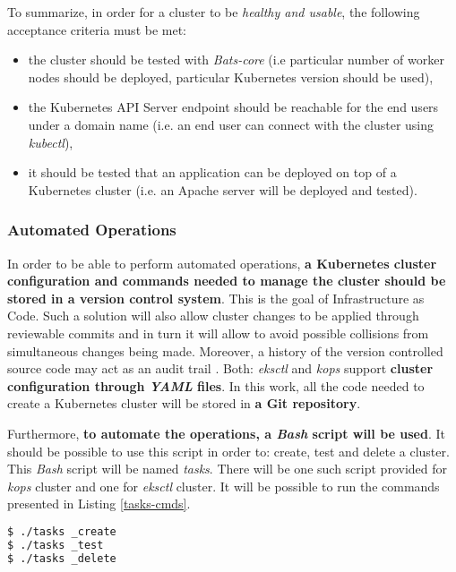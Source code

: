 To summarize, in order for a cluster to be \textit{healthy and usable}, the following acceptance criteria must be met:
\begin{itemize}
\item the cluster should be tested with \textit{Bats-core} (i.e particular number of worker nodes should be deployed, particular Kubernetes version should be used),
\item the Kubernetes API Server endpoint should be reachable for the end users under a domain name (i.e. an end user can connect with the cluster using \textit{kubectl}),
\item it should be tested that an application can be deployed on top of a Kubernetes cluster (i.e. an Apache server will be deployed and tested).
\end{itemize}

\subsubsection{Automated Operations}

In order to be able to perform automated operations, \textbf{a Kubernetes cluster configuration and commands needed to manage the cluster should be stored in a version control system}. This is the goal of Infrastructure as Code. Such a solution will also allow cluster changes to be applied through reviewable commits and in turn it will allow to avoid possible collisions from simultaneous changes being made. Moreover, a history of the version controlled source code may act as an audit trail \cite{online-kops-ci,online-kops-manifest}. Both: \textit{eksctl} and \textit{kops} support \textbf{cluster configuration through \textit{YAML} files}. In this work, all the code needed to create a Kubernetes cluster will be stored in \textbf{a Git repository}.

Furthermore, \textbf{to automate the operations, a \textit{Bash} script will be used}. It should be possible to use this script in order to: create, test and delete a cluster. This \textit{Bash} script will be named \textit{tasks}. There will be one such script provided for \textit{kops} cluster and one for \textit{eksctl} cluster. It will be possible to run the commands presented in Listing \ref{tasks-cmds}.
\begin{lstlisting}[basicstyle=\small,caption={Commands provided by tasks file -- a \textit{Bash} script which automates a~Kubernetes cluster operations},captionpos=b,language=Bash,xleftmargin=1cm,label=tasks-cmds]
$ ./tasks _create
$ ./tasks _test
$ ./tasks _delete
\end{lstlisting}

